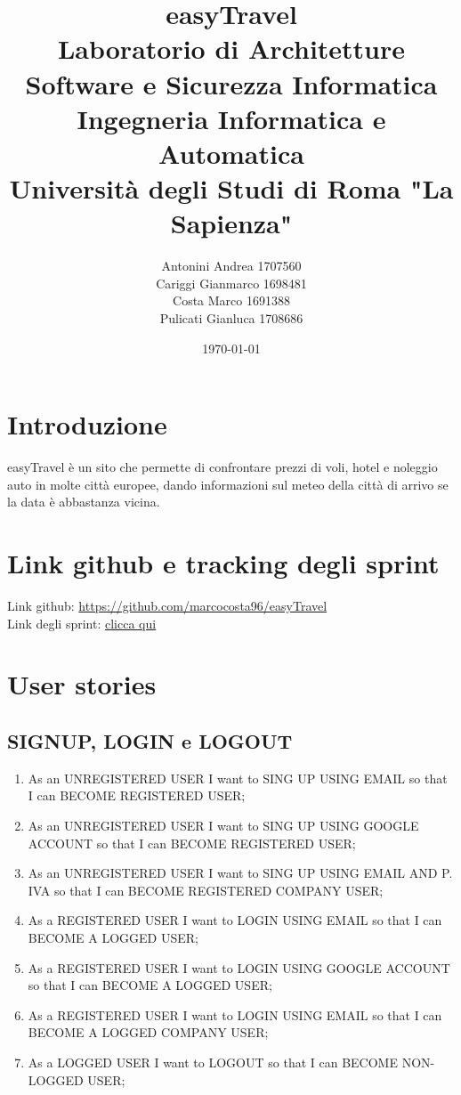 \documentclass[11pt]{article}
\title{\textbf{easyTravel} \\ \bigskip \large Laboratorio di Architetture Software e Sicurezza Informatica \\ Ingegneria Informatica e Automatica \\ Università degli Studi di Roma "La Sapienza"}
\author{Antonini Andrea 1707560\\Cariggi Gianmarco 1698481\\Costa Marco 1691388\\Pulicati Gianluca 1708686}
\date{\today}
\begin{document}
\maketitle

\tableofcontents

\section{Introduzione}

easyTravel è un sito che permette di confrontare prezzi di voli, hotel e noleggio auto in molte
città europee, dando informazioni sul meteo della città di arrivo se la data è abbastanza vicina.

\section{Link github e tracking degli sprint}

Link github: \href{https://github.com/marcocosta96/easyTravel}{https://github.com/marcocosta96/easyTravel} \\
Link degli sprint: \href{https://docs.google.com/spreadsheets/d/14VnUUgNbMTW1_EG6KlEAEggAsf6aBKnaC1etXz5ji0I/edit#gid=12}{clicca qui} %

\section{User stories}

\subsection{SIGNUP, LOGIN e LOGOUT}
\begin{enumerate}
	\item As an UNREGISTERED USER I want to SING UP USING EMAIL so that I can BECOME REGISTERED USER;
	\item As an UNREGISTERED USER I want to SING UP USING GOOGLE ACCOUNT so that I can BECOME REGISTERED USER;
	\item As an UNREGISTERED USER I want to SING UP USING EMAIL AND P. IVA so that I can BECOME REGISTERED COMPANY USER;
	\item As a REGISTERED USER I want to LOGIN USING EMAIL so that I can BECOME A LOGGED USER;
	\item As a REGISTERED USER I want to LOGIN USING GOOGLE ACCOUNT so that I can BECOME A LOGGED USER;
	\item As a REGISTERED USER I want to LOGIN USING EMAIL so that I can BECOME A LOGGED COMPANY USER;
	\item As a LOGGED USER I want to LOGOUT so that I can BECOME NON-LOGGED USER;
\end{enumerate}
\end{document}
